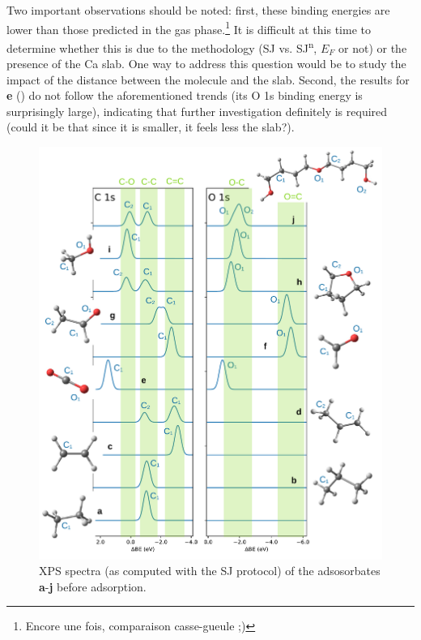 \documentclass[journal=jpccck,manuscript=article]{achemso}
\begin{document}
Two important observations should be noted: first, these binding energies are lower than those predicted in the gas phase.\footnote{Encore une fois, comparaison casse-gueule ;)} It is difficult at this time to determine whether this is due to the methodology (SJ vs. SJ\textsuperscript{n}, $E_F$ or not) or the presence of the Ca slab. One way to address this question would be to study the impact of the distance between the molecule and the slab. Second, the results for \textbf{e} () do not follow the aforementioned trends (its O 1s binding energy is surprisingly large), indicating that further investigation definitely is required (could it be that since it is smaller, it feels less the slab?).

\begin{figure}[!h]
	\includegraphics[width=\linewidth]{Figure10}
	\caption{XPS spectra (as computed with the SJ protocol) of the adsosorbates \textbf{a}-\textbf{j} before adsorption.}
	\label{fig:adsorbare}
\end{figure}

\clearpage
\end{document}
